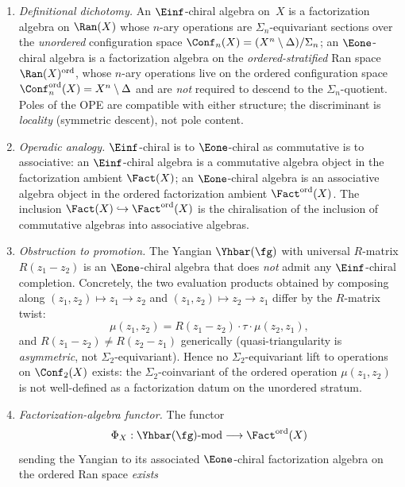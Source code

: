 \begin{proposition}
\label{prop:e1-chiral-vs-e-infty-chiral-obstruction}
\leavevmode
\begin{enumerate}[label=\textup{(\roman*)}]
\item \emph{Definitional dichotomy.} An $\Einf$-chiral algebra on~$X$
is a factorization algebra on $\Ran(X)$ whose $n$-ary operations are
$\Sigma_n$-equivariant sections over the \emph{unordered} configuration
space $\Conf_n(X) = (X^n \setminus \Delta)/\Sigma_n$; an
$\Eone$-chiral algebra is a factorization algebra on the
\emph{ordered-stratified} Ran space $\Ran(X)^{\mathrm{ord}}$, whose
$n$-ary operations live on the ordered configuration space
$\Conf_n^{\mathrm{ord}}(X) = X^n \setminus \Delta$ and are
\emph{not} required to descend to the $\Sigma_n$-quotient. Poles of
the OPE are compatible with either structure; the discriminant is
\emph{locality} (symmetric descent), not pole content.
\item \emph{Operadic analogy.} $\Einf$-chiral is to $\Eone$-chiral as
commutative is to associative: an $\Einf$-chiral algebra is a
commutative algebra object in the factorization ambient
$\Fact(X)$; an $\Eone$-chiral algebra is an associative algebra
object in the ordered factorization ambient
$\Fact^{\mathrm{ord}}(X)$. The inclusion
$\Fact(X) \hookrightarrow \Fact^{\mathrm{ord}}(X)$ is the chiralisation
of the inclusion of commutative algebras into associative algebras.
\item \emph{Obstruction to promotion.} The Yangian $\Yhbar(\fg)$ with
universal $R$-matrix $R(z_1 - z_2)$ is an $\Eone$-chiral algebra that
does \emph{not} admit any $\Einf$-chiral completion. Concretely, the
two evaluation products obtained by composing along
$(z_1, z_2) \mapsto z_1 \to z_2$ and $(z_1, z_2) \mapsto z_2 \to z_1$
differ by the $R$-matrix twist:
\[
\mu(z_1, z_2) = R(z_1 - z_2) \cdot \tau \cdot \mu(z_2, z_1),
\]
and $R(z_1 - z_2) \ne R(z_2 - z_1)$ generically
(quasi-triangularity is \emph{asymmetric}, not $\Sigma_2$-equivariant).
Hence no $\Sigma_2$-equivariant lift to operations on
$\Conf_2(X)$ exists: the $\Sigma_2$-coinvariant of the ordered
operation $\mu(z_1, z_2)$ is not well-defined as a factorization
datum on the unordered stratum.
\item \emph{Factorization-algebra functor.} The functor
\[
\Phi_X : \Yhbar(\fg)\text{-}\mathrm{mod} \longrightarrow
\Fact^{\mathrm{ord}}(X)
\]
sending the Yangian to its associated $\Eone$-chiral factorization
algebra on the ordered Ran space \emph{exists}

\end{enumerate}
\end{proposition}
